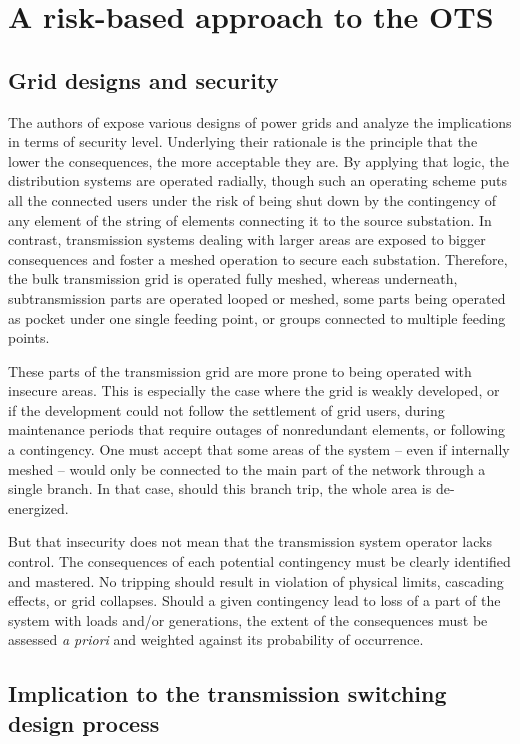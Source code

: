 \section{A risk-based approach to the OTS}

\subsection{Grid designs and security}

The authors of \cite{eggletonNETWORKSTRUCTURESUBTRANSMISSION1993} expose various
designs of power grids and analyze the implications in terms of security level. Underlying
their rationale is the principle that the lower the consequences, the more
acceptable they are. By applying that logic, the distribution systems are
operated radially, though such an operating scheme puts all the connected users under
the risk of being shut down by the contingency of any element of the string of elements
connecting it to the source substation. In contrast, transmission systems dealing
with larger areas are exposed to bigger consequences and foster a meshed operation
to secure each substation. Therefore, the bulk transmission grid is operated fully
meshed, whereas underneath, subtransmission parts are operated looped or meshed,
some parts being operated as pocket under one single feeding point, or groups connected
to multiple feeding points.

These parts of the transmission grid are more prone to being operated with insecure
areas. This is especially the case where the grid is weakly developed, or if the
development could not follow the settlement of grid users, during maintenance
periods that require outages of nonredundant elements, or following a contingency.
One must accept that some areas of the system -- even if internally meshed --
would only be connected to the main part of the network through a single branch.
In that case, should this branch trip, the whole area is de-energized.

But that insecurity does not mean that the transmission system operator lacks control.
The consequences of each potential contingency must be clearly identified and
mastered. No tripping should result in violation of physical limits, cascading
effects, or grid collapses. Should a given contingency lead to loss of a part of
the system with loads and/or generations, the extent of the consequences must be
assessed \emph{a priori} and weighted against its probability of occurrence.

\subsection{Implication to the transmission switching design process}

